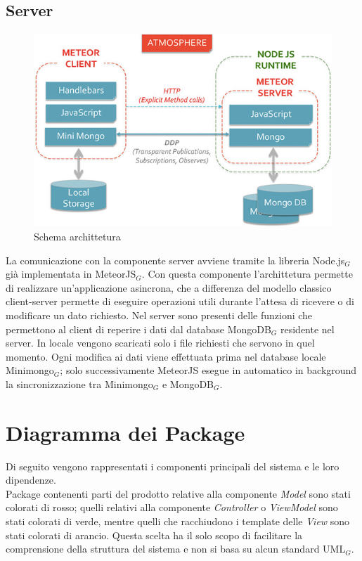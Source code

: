 \subsection{Server}

\begin{figure}[h]
\begin{center}
\includegraphics[scale=0.70]{img/meteor_architettura.jpg}
\caption{Schema archittetura}
\end{center}
\end{figure}

La comunicazione con la componente server avviene tramite la libreria Node.js$_G$ già implementata in MeteorJS$_G$. Con questa componente l'archittetura permette di realizzare un'applicazione asincrona, che a differenza del modello classico client-server permette di eseguire operazioni utili durante l'attesa di ricevere o di modificare un dato richiesto.
Nel server sono presenti delle funzioni che permettono al client di reperire i dati dal database MongoDB$_G$ residente nel server. In locale vengono scaricati solo i file richiesti che servono in quel momento. Ogni modifica ai dati viene effettuata prima nel database locale Minimongo$_G$; solo successivamente MeteorJS esegue in automatico in background la sincronizzazione tra Minimongo$_G$ e MongoDB$_G$.
\clearpage
\newpage
\section{Diagramma dei Package}
Di seguito vengono rappresentati i componenti principali del sistema e le loro dipendenze. \\
Package contenenti parti del prodotto relative alla componente \textit{Model} sono stati colorati di rosso; quelli relativi alla componente \textit{Controller} o \textit{ViewModel} sono stati colorati di verde, mentre quelli che racchiudono i template delle \textit{View} sono stati colorati di arancio. Questa scelta ha il solo scopo di facilitare la comprensione della struttura del sistema e non si basa su alcun standard UML$_G$.

